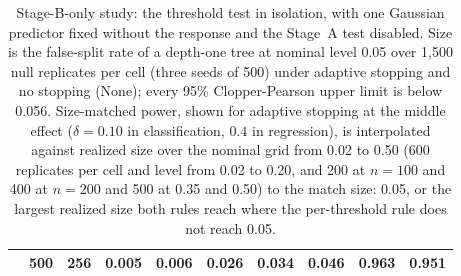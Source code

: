 \begin{table}[tb]
\begin{tabular}{@{}lrrrrrrrrr@{}}
     & 500 & 256 & 0.005 & 0.006 & 0.026 & 0.034 & 0.046 & 0.963 & 0.951 \\
    \bottomrule
  \end{tabular}
  \caption{Stage-B-only study: the threshold test in isolation, with one
  Gaussian predictor fixed without the response and the Stage~A test disabled.
  Size is the false-split rate of a depth-one tree at nominal level 0.05 over
  1,500 null replicates per cell (three seeds of 500) under adaptive stopping
  and no stopping (None); every 95\% Clopper-Pearson upper limit is below
  0.056. Size-matched power, shown for adaptive stopping at the middle effect
  ($\delta = 0.10$ in classification, $0.4$ in regression), is interpolated
  against realized size over the nominal grid from 0.02 to 0.50 (600 replicates
  per cell and level from 0.02 to 0.20, and 200 at $n=100$ and 400 at $n=200$
  and 500 at 0.35 and 0.50) to the match size: 0.05, or the largest realized size
  both rules reach where the per-threshold rule does not reach 0.05.}
  \label{tab:stageB-only-full}
\end{table}

